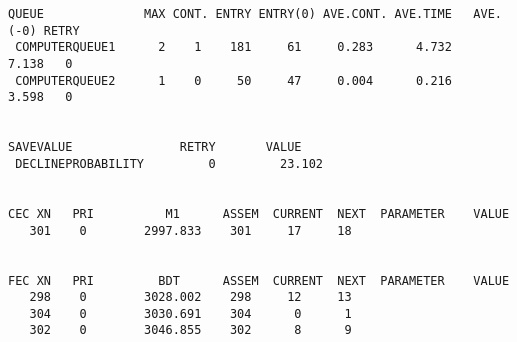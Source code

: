 \begin{lstlisting}[label=lst:1,caption=Результат работы разработанной программы]
QUEUE              MAX CONT. ENTRY ENTRY(0) AVE.CONT. AVE.TIME   AVE.(-0) RETRY
 COMPUTERQUEUE1      2    1    181     61     0.283      4.732      7.138   0
 COMPUTERQUEUE2      1    0     50     47     0.004      0.216      3.598   0


SAVEVALUE               RETRY       VALUE
 DECLINEPROBABILITY         0         23.102                            


CEC XN   PRI          M1      ASSEM  CURRENT  NEXT  PARAMETER    VALUE
   301    0        2997.833    301     17     18


FEC XN   PRI         BDT      ASSEM  CURRENT  NEXT  PARAMETER    VALUE
   298    0        3028.002    298     12     13
   304    0        3030.691    304      0      1
   302    0        3046.855    302      8      9
\end{lstlisting}
